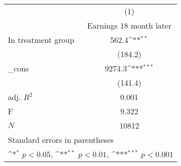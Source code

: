 {
\def\sym#1{\ifmmode^{#1}\else\(^{#1}\)\fi}
\begin{tabular}{l*{1}{c}}
\hline\hline
            &\multicolumn{1}{c}{(1)}\\
            &\multicolumn{1}{c}{Earnings 18 month later}\\
\hline
In treatment group&       562.4\sym{**} \\
            &     (184.2)         \\
[1em]
\_cons      &      9274.3\sym{***}\\
            &     (141.4)         \\
\hline
adj. \(R^{2}\)&       0.001         \\
F           &       9.322         \\
\(N\)       &       10812         \\
\hline\hline
\multicolumn{2}{l}{\footnotesize Standard errors in parentheses}\\
\multicolumn{2}{l}{\footnotesize \sym{*} \(p<0.05\), \sym{**} \(p<0.01\), \sym{***} \(p<0.001\)}\\
\end{tabular}
}

